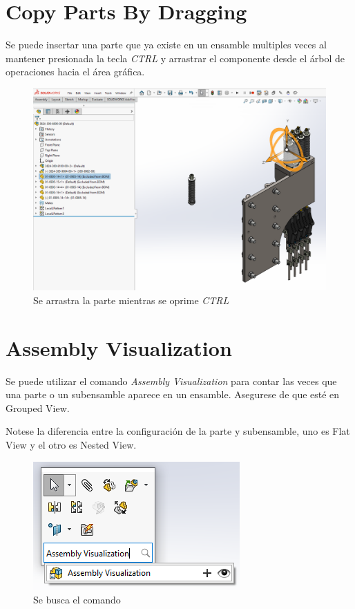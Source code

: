 \documentclass{report}
\begin{document}
\chapter{Copy Parts By Dragging}

Se puede insertar una parte que ya existe en un ensamble multiples veces al mantener presionada la tecla \emph{CTRL} y arrastrar el componente desde el árbol de operaciones hacia el área gráfica.

\begin{figure}[H]
	\centering
	\includegraphics[width=0.85\linewidth, height=0.5\textheight,keepaspectratio]{Imagenes/solidworks_copiarconctrl01}
	\caption{Se arrastra la parte mientras se oprime \emph{CTRL}}
	\label{fig:solidworkscopiarconctrl01}
\end{figure}

\chapter{Assembly Visualization}

Se puede utilizar el comando \emph{Assembly Visualization} para contar las veces que una parte o un subensamble aparece en un ensamble. Asegurese de que esté en Grouped View.

Notese la diferencia entre la configuración de la parte y subensamble, uno es Flat View y el otro es Nested View.

\begin{figure}[H]
	\centering
	\includegraphics[width=0.65\linewidth, height=0.45\textheight,keepaspectratio]{Imagenes/solidworks_assemblyvisualization01}
	\caption{Se busca el comando}
	\label{fig:solidworksassemblyvisualization01}
\end{figure}
\end{document}
